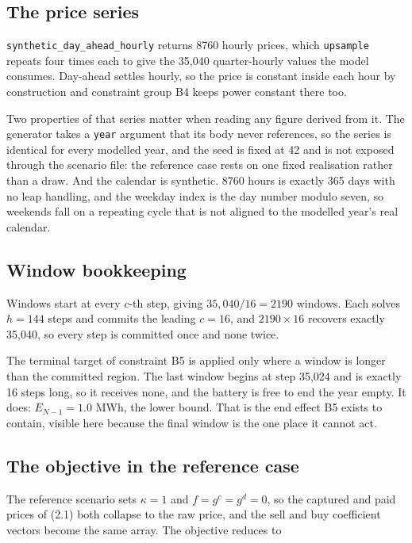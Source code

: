 \documentclass[11pt,a4paper]{article}
\numberwithin{equation}{section}
\begin{document}
\subsection{The price series}

\nolinkurl{synthetic_day_ahead_hourly} returns 8760 hourly prices, which
\nolinkurl{upsample} repeats four times each to give the 35{,}040 quarter-hourly
values the model consumes. Day-ahead settles hourly, so the price is constant
inside each hour by construction and constraint group B4 keeps power constant
there too.

Two properties of that series matter when reading any figure derived from it.
The generator takes a \nolinkurl{year} argument that its body never references,
so the series is identical for every modelled year, and the seed is fixed at 42
and is not exposed through the scenario file: the reference case rests on one
fixed realisation rather than a draw. And the calendar is synthetic. 8760 hours
is exactly 365 days with no leap handling, and the weekday index is the day
number modulo seven, so weekends fall on a repeating cycle that is not aligned
to the modelled year's real calendar.

\subsection{Window bookkeeping}

Windows start at every $c$-th step, giving $35{,}040 / 16 = 2190$ windows. Each
solves $h = 144$ steps and commits the leading $c = 16$, and $2190 \times 16$
recovers exactly 35{,}040, so every step is committed once and none twice.

The terminal target of constraint B5 is applied only where a window is longer
than the committed region. The last window begins at step 35{,}024 and is exactly
16 steps long, so it receives none, and the battery is free to end the year
empty. It does: $E_{N-1} = 1.0$ MWh, the lower bound. That is the end effect B5
exists to contain, visible here because the final window is the one place it
cannot act.

\subsection{The objective in the reference case}

The reference scenario sets $\kappa = 1$ and $f = g^{c} = g^{d} = 0$, so the
captured and paid prices of (2.1) both collapse to the raw price, and the sell
and buy coefficient vectors become the same array. The objective reduces to
\end{document}

